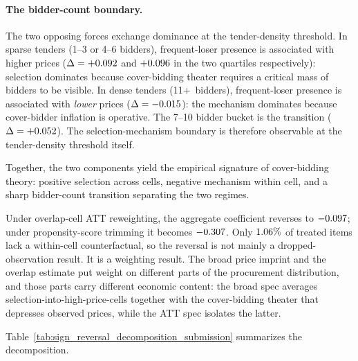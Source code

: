 \paragraph{The bidder-count boundary.}
The two opposing forces exchange dominance at the
tender-density threshold. In sparse tenders (1--3 or 4--6
bidders), frequent-loser presence is associated with higher
prices ($\Delta=+0.092$ and
$+0.096$ in the two quartiles respectively):
selection dominates because cover-bidding theater requires a
critical mass of bidders to be visible. In dense tenders
(11+~bidders), frequent-loser presence is associated with
\emph{lower} prices ($\Delta=-0.015$):
the mechanism dominates because cover-bidder inflation is
operative. The 7--10 bidder bucket is the transition
($\Delta=+0.052$). The selection-mechanism
boundary is therefore observable at the tender-density
threshold itself.

Together, the two components yield the empirical signature of
cover-bidding theory: positive selection across cells, negative
mechanism within cell, and a sharp bidder-count transition
separating the two regimes.

Under overlap-cell ATT reweighting, the aggregate coefficient
reverses to $-0.097$; under propensity-score
trimming it becomes $-0.307$. Only
$1.06\%$ of treated items lack a within-cell
counterfactual, so the reversal is not mainly a
dropped-observation result. It is a weighting result. The broad
price imprint and the overlap estimate put weight on different
parts of the procurement distribution, and those parts carry
different economic content: the broad spec averages
selection-into-high-price-cells together with the cover-bidding
theater that depresses observed prices, while the ATT spec
isolates the latter.

Table~\ref{tab:sign_reversal_decomposition_submission} summarizes
the decomposition.

